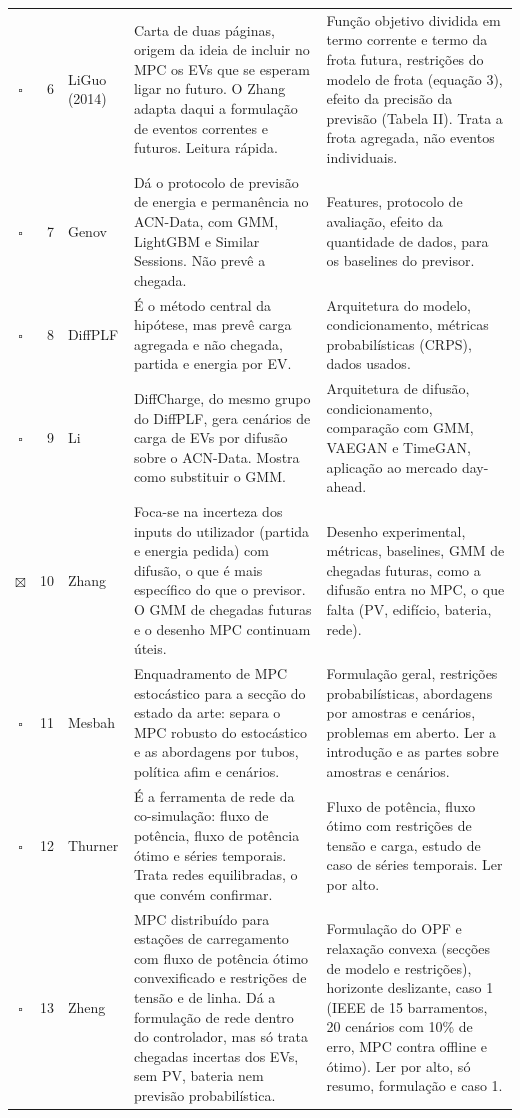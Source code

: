 \documentclass[11pt,a4paper]{article}
\newcommand{\ckN}{$\square$}  %
\newcommand{\ckY}{$\boxtimes$} %
\begin{document}
\begin{center}
\begin{longtable}{@{}c r P{1.9cm} P{5.0cm} P{5.9cm}@{}}
\ckN & 6 & LiGuo (2014) & Carta de duas páginas, origem da ideia de incluir no MPC os EVs que se esperam ligar no futuro. O Zhang adapta daqui a formulação de eventos correntes e futuros. Leitura rápida. & Função objetivo dividida em termo corrente e termo da frota futura, restrições do modelo de frota (equação 3), efeito da precisão da previsão (Tabela II). Trata a frota agregada, não eventos individuais. \\
\ckN & 7 & Genov & Dá o protocolo de previsão de energia e permanência no ACN-Data, com GMM, LightGBM e Similar Sessions. Não prevê a chegada. & Features, protocolo de avaliação, efeito da quantidade de dados, para os baselines do previsor. \\
\ckN & 8 & DiffPLF & É o método central da hipótese, mas prevê carga agregada e não chegada, partida e energia por EV. & Arquitetura do modelo, condicionamento, métricas probabilísticas (CRPS), dados usados. \\
\ckN & 9 & Li & DiffCharge, do mesmo grupo do DiffPLF, gera cenários de carga de EVs por difusão sobre o ACN-Data. Mostra como substituir o GMM. & Arquitetura de difusão, condicionamento, comparação com GMM, VAEGAN e TimeGAN, aplicação ao mercado day-ahead. \\
\ckY & 10 & Zhang & Foca-se na incerteza dos inputs do utilizador (partida e energia pedida) com difusão, o que é mais específico do que o previsor. O GMM de chegadas futuras e o desenho MPC continuam úteis. & Desenho experimental, métricas, baselines, GMM de chegadas futuras, como a difusão entra no MPC, o que falta (PV, edifício, bateria, rede). \\
\ckN & 11 & Mesbah & Enquadramento de MPC estocástico para a secção do estado da arte: separa o MPC robusto do estocástico e as abordagens por tubos, política afim e cenários. & Formulação geral, restrições probabilísticas, abordagens por amostras e cenários, problemas em aberto. Ler a introdução e as partes sobre amostras e cenários. \\
\ckN & 12 & Thurner & É a ferramenta de rede da co-simulação: fluxo de potência, fluxo de potência ótimo e séries temporais. Trata redes equilibradas, o que convém confirmar. & Fluxo de potência, fluxo ótimo com restrições de tensão e carga, estudo de caso de séries temporais. Ler por alto. \\
\ckN & 13 & Zheng & MPC distribuído para estações de carregamento com fluxo de potência ótimo convexificado e restrições de tensão e de linha. Dá a formulação de rede dentro do controlador, mas só trata chegadas incertas dos EVs, sem PV, bateria nem previsão probabilística. & Formulação do OPF e relaxação convexa (secções de modelo e restrições), horizonte deslizante, caso 1 (IEEE de 15 barramentos, 20 cenários com 10\% de erro, MPC contra offline e ótimo). Ler por alto, só resumo, formulação e caso 1. \\

\end{longtable}
\end{center}
\end{document}

